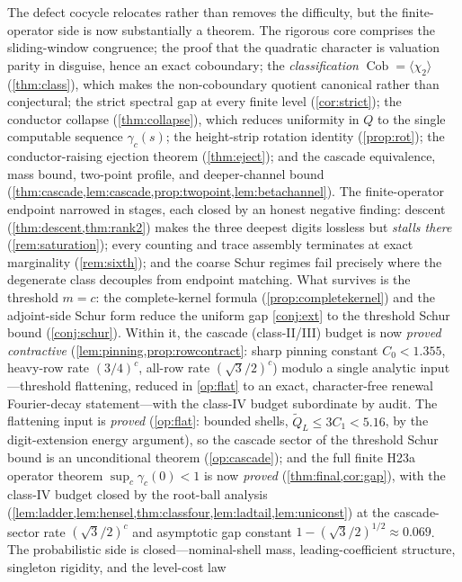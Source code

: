 \documentclass[11pt]{article}
\theoremstyle{plain}
\theoremstyle{definition}
\theoremstyle{remark}
\begin{document}
The defect cocycle relocates rather than removes the difficulty, but the
finite-operator side is now substantially a theorem. The rigorous core comprises
the sliding-window congruence; the proof that the quadratic character is
valuation parity in disguise, hence an exact coboundary; the \emph{classification}
$\operatorname{Cob}=\langle\chi_2\rangle$ (\cref{thm:class}), which makes the
non-coboundary quotient canonical rather than conjectural; the strict spectral
gap at every finite level (\cref{cor:strict}); the conductor collapse
(\cref{thm:collapse}), which reduces uniformity in $Q$ to the single computable
sequence $\gamma_c(s)$; the height-strip rotation identity
(\cref{prop:rot}); the conductor-raising ejection theorem
(\cref{thm:eject}); and the cascade equivalence, mass bound, two-point
profile, and deeper-channel bound
(\cref{thm:cascade,lem:cascade,prop:twopoint,lem:betachannel}). The
finite-operator endpoint narrowed in stages, each closed by an honest
negative finding: descent (\cref{thm:descent,thm:rank2}) makes the three
deepest digits lossless but \emph{stalls there} (\cref{rem:saturation});
every counting and trace assembly terminates at exact marginality
(\cref{rem:sixth}); and the coarse Schur regimes fail precisely where the
degenerate class decouples from endpoint matching. What survives is the
threshold $m=c$: the complete-kernel formula (\cref{prop:completekernel})
and the adjoint-side Schur form reduce the uniform gap \cref{conj:ext} to
the threshold Schur bound (\cref{conj:schur}). Within it, the cascade
(class-II/III) budget is now \emph{proved contractive}
(\cref{lem:pinning,prop:rowcontract}: sharp pinning constant
$C_0<1.355$, heavy-row rate $(3/4)^c$, all-row rate $(\sqrt3/2)^c$) modulo
a single analytic input---threshold flattening, reduced in
\cref{op:flat} to an exact, character-free renewal Fourier-decay
statement---with the class-IV budget subordinate by audit. The flattening
input is \emph{proved} (\cref{op:flat}: bounded shells,
$\tilde Q_L\le3C_1<5.16$, by the digit-extension energy argument), so the
cascade sector of the threshold Schur bound is an unconditional theorem
(\cref{op:cascade}); and the full finite H23a operator theorem
$\sup_c\gamma_c(0)<1$ is now \emph{proved} (\cref{thm:final,cor:gap}),
with the class-IV budget closed by the root-ball analysis
(\cref{lem:ladder,lem:hensel,thm:classfour,lem:ladtail,lem:uniconst})
at the cascade-sector rate $(\sqrt3/2)^c$ and asymptotic gap constant
$1-(\sqrt3/2)^{1/2}\approx0.069$. The probabilistic side is closed---nominal-shell mass,
leading-coefficient structure, singleton rigidity, and the level-cost law
\end{document}
